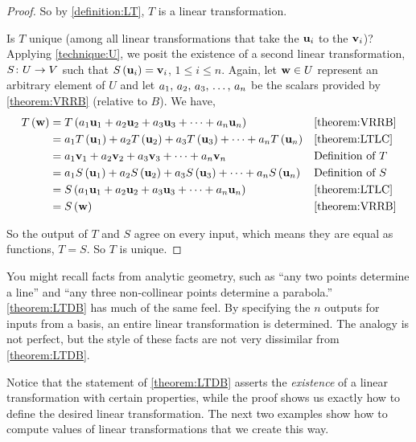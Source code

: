\documentclass{ximera}
\begin{document}
\begin{theorem}
\begin{proof}
So by \ref{definition:LT}, $T$ is a linear transformation.

Is $T$ unique (among all linear transformations that take the $\mathbf{u}_i$ to the $\mathbf{v}_i$)?  Applying \ref{technique:U}, we posit the existence of a second linear transformation, $S\colon U\rightarrow V$ such that $S\left(\mathbf{u}_i\right)=\mathbf{v}_i$, $1\leq i\leq n$.  Again, let $\mathbf{w}\in U$ represent an arbitrary element of $U$ and let ${a}_{1},\,{a}_{2},\,{a}_{3},\,\ldots,\,{a}_{n}$ be the scalars provided by \ref{theorem:VRRB} (relative to $B$).  We have,
\begin{align*}
T\left(\mathbf{w}\right)&=
T\left(a_{1}\mathbf{u}_{1}+a_{2}\mathbf{u}_{2}+a_{3}\mathbf{u}_{3}+\cdots +a_{n}\mathbf{u}_{n}\right)
&&\ref{theorem:VRRB}\\
&=
a_1T\left(\mathbf{u}_1\right)+
a_2T\left(\mathbf{u}_2\right)+
a_3T\left(\mathbf{u}_3\right)+
\cdots+
a_nT\left(\mathbf{u}_n\right)
&&\ref{theorem:LTLC}\\
&=
a_1\mathbf{v}_1+
a_2\mathbf{v}_2+
a_3\mathbf{v}_3+
\cdots+
a_n\mathbf{v}_n
&&\text{Definition of $T$}\\
&=
a_1S\left(\mathbf{u}_1\right)+
a_2S\left(\mathbf{u}_2\right)+
a_3S\left(\mathbf{u}_3\right)+
\cdots+
a_nS\left(\mathbf{u}_n\right)
&&\text{Definition of $S$}\\
&=
S\left(a_{1}\mathbf{u}_{1}+a_{2}\mathbf{u}_{2}+a_{3}\mathbf{u}_{3}+\cdots +a_{n}\mathbf{u}_{n}\right)
&&\ref{theorem:LTLC}\\
&=
S\left(\mathbf{w}\right)
&&\ref{theorem:VRRB}
\end{align*}


So the output of $T$ and $S$ agree on every input, which means they are equal as functions, $T=S$.  So $T$ is unique.

\end{proof}
\end{theorem}

You might recall facts from analytic geometry, such as ``any two
points determine a line'' and ``any three non-collinear points
determine a parabola.''  \ref{theorem:LTDB} has much of the same feel.
By specifying the $n$ outputs for inputs from a basis, an entire
linear transformation is determined.  The analogy is not perfect, but
the style of these facts are not very dissimilar from
\ref{theorem:LTDB}.

Notice that the statement of \ref{theorem:LTDB} asserts the
\textit{existence} of a linear transformation with certain properties,
while the proof shows us exactly how to define the desired linear
transformation. The next two examples show how to compute values of
linear transformations that we create this way.
\end{document}
